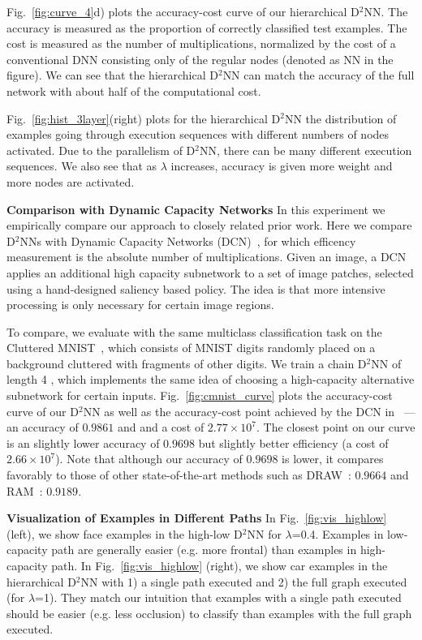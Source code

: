 \documentclass[10pt,twocolumn,letterpaper]{article}
\newcommand{\smallparagraph}[1]{\smallskip \noindent \textbf{#1}}
\begin{document}
Fig.~\ref{fig:curve_4}d) plots the accuracy-cost curve of our hierarchical
D$^2$NN. The accuracy is measured as the proportion of correctly classified test
examples. The cost is measured as the number of multiplications, normalized by the cost of
a conventional DNN consisting only of the regular nodes (denoted as NN in the figure).
We can see that
the hierarchical D$^2$NN can match the accuracy of the full network with about half of the computational
cost.

Fig.~\ref{fig:hist_3layer}(right) plots for the hierarchical D$^2$NN the distribution of examples going through
execution sequences with different numbers of nodes activated. Due to the parallelism of
D$^2$NN, there can be many different execution sequences. We also see that as $\lambda$
increases, accuracy is given more weight and more nodes are activated. 

\smallparagraph{Comparison with Dynamic Capacity Networks}
In this experiment we empirically compare our approach to closely related prior work. 
Here we compare D$^2$NNs with Dynamic Capacity Networks
(DCN)~\cite{DBLP:conf/icml/AlmahairiBCZLC16}, for which efficency measurement is
the absolute number of multiplications. Given an image, a DCN applies an additional high capacity subnetwork to a set of image patches, selected using a
hand-designed saliency based policy. The idea is that more intensive processing is only
necessary for certain image regions. 

To compare, we evaluate with the same multiclass classification task on the Cluttered
MNIST~\cite{mnih2014recurrent}, which consists of MNIST digits randomly placed on a
background cluttered with fragments of other digits. We train a chain D$^2$NN of length 4
, which implements the same idea of choosing a high-capacity alternative subnetwork for
certain inputs. Fig.~\ref{fig:cmnist_curve} plots the accuracy-cost curve of our D$^2$NN
as well as the accuracy-cost point achieved by the 
DCN in ~\cite{DBLP:conf/icml/AlmahairiBCZLC16}---an accuracy of $0.9861$ and
and a cost of $2.77\times10^7$. The closest point on our curve is an
slightly lower accuracy of $0.9698$ but slightly better efficiency (a cost of $2.66\times10^7$). Note
that although our accuracy of $0.9698$ is lower, it compares favorably to those of other state-of-the-art methods
such as DRAW~\cite{gregor2015draw}: $0.9664$ and RAM~\cite{mnih2014recurrent}: $0.9189$. 

\smallparagraph{Visualization of Examples in Different Paths}
In Fig.~\ref{fig:vis_highlow} (left), we show face examples in the high-low D$^2$NN for $\lambda$=0.4. Examples in low-capacity path are generally easier (e.g. more frontal) than examples in high-capacity path. 
In Fig.~\ref{fig:vis_highlow} (right), we show car examples in the hierarchical D$^2$NN with 1) a single path executed and 2) the full graph executed (for $\lambda$=1). They match our intuition that examples with a single path executed should be easier (e.g. less occlusion) to classify than examples with the full graph executed. 
\end{document}
